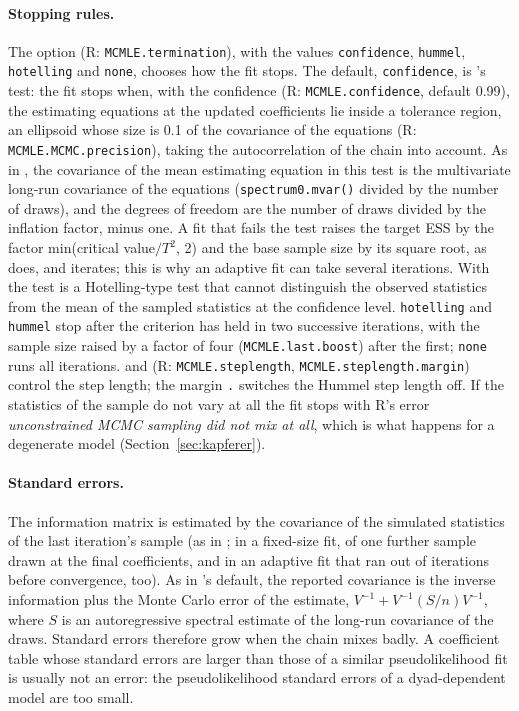 \paragraph{Stopping rules.} The option  (R: \texttt{MCMLE.termination}), with the values \texttt{confidence}, \texttt{hummel}, \texttt{hotelling} and \texttt{none}, chooses how the fit stops. The default, \texttt{confidence}, is \ergm{}'s test: the fit stops when, with the confidence  (R: \texttt{MCMLE.confidence}, default 0.99), the estimating equations at the updated coefficients lie inside a tolerance region, an ellipsoid whose size is 0.1 of the covariance of the equations (R: \texttt{MCMLE.MCMC.precision}), taking the autocorrelation of the chain into account. As in \ergm{}, the covariance of the mean estimating equation in this test is the multivariate long-run covariance of the equations (\texttt{spectrum0.mvar()} divided by the number of draws), and the degrees of freedom are the number of draws divided by the inflation factor, minus one. A fit that fails the test raises the target ESS by the factor min(critical value$/T^2$, 2) and the base sample size by its square root, as \ergm{} does, and iterates; this is why an adaptive fit can take several iterations. With  the test is a Hotelling-type test that cannot distinguish the observed statistics from the mean of the sampled statistics at the confidence level. \texttt{hotelling} and \texttt{hummel} stop after the criterion has held in two successive iterations, with the sample size raised by a factor of four (\texttt{MCMLE.last.boost}) after the first; \texttt{none} runs all iterations.  and  (R: \texttt{MCMLE.steplength}, \texttt{MCMLE.steplength.margin}) control the step length; the margin \texttt{.} switches the Hummel step length off. If the statistics of the sample do not vary at all the fit stops with R's error \emph{unconstrained MCMC sampling did not mix at all}, which is what happens for a degenerate model (Section~\ref{sec:kapferer}).

\paragraph{Standard errors.} The information matrix is estimated by the covariance of the simulated statistics of the last iteration's sample (as in \ergm{}; in a fixed-size fit, of one further sample drawn at the final coefficients, and in an adaptive fit that ran out of iterations before convergence, too). As in \ergm{}'s default, the reported covariance is the inverse information plus the Monte Carlo error of the estimate, $V^{-1}+V^{-1}(S/n)V^{-1}$, where $S$ is an autoregressive spectral estimate of the long-run covariance of the draws. Standard errors therefore grow when the chain mixes badly. A coefficient table whose standard errors are larger than those of a similar pseudolikelihood fit is usually not an error: the pseudolikelihood standard errors of a dyad-dependent model are too small.

